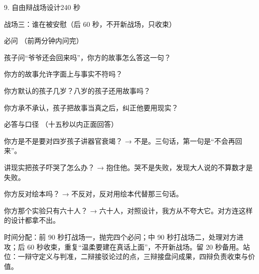 \documentclass[script,pro]{debate}
\begin{document}
\begin{stage}{9. 自由辩战场设计}{240 秒}
\begin{battleground}{战场三：谁在被安慰（后 60 秒，不开新战场，只收束）}
\begin{bullets}
\end{bullets}
\begin{points}{必问 （前两分钟内问完）}
\item 孩子问“爷爷还会回来吗”，你方的故事怎么答这一句？
\item 你方的故事允许字面上与事实不符吗？
\item 你方默认的孩子几岁？八岁的孩子还用故事吗？
\item 你方承不承认，孩子把故事当真之后，纠正他要用现实？
\end{points}
\begin{points}{必答与口径 （十五秒以内正面回答）}
\item 你方是不是要对四岁孩子讲器官衰竭？ → 不是。三句话，第一句是“不会再回来”。
\item 讲现实把孩子吓哭了怎么办？ → 抱住他。哭不是失败，发现大人说的不算数才是失败。
\item 你方反对绘本吗？ → 不反对，反对用绘本代替那三句话。
\item 你方那个实验只有六十人？ → 六十人，对照设计，我方从不夸大它。对方连这样的设计都拿不出。
\end{points}
时间分配：前 90 秒打战场一，抛完四个必问；中 90 秒打战场二，处理对方进攻；后 60 秒收束，重复“温柔要建在真话上面”，不开新战场。留 20 秒备用。站位：一辩守定义与判准，二辩接驳论过的点，三辩接盘问成果，四辩负责收束与价值。

\end{battleground}
\end{stage}
\end{document}
